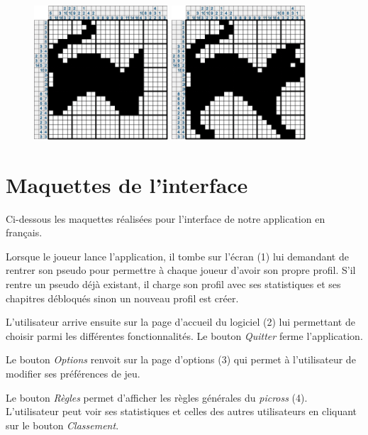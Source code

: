 \documentclass{report}
\begin{document}
\begin{figure}[H]
			\hspace{1cm}
          		\includegraphics[width=5cm]{../Images/cat/cat5.png}
			\hspace{1cm}
			\includegraphics[width=5cm]{../Images/cat/cat6.png}
		\end{figure}
		
	
	\section{Maquettes de l'interface}
      
      		Ci-dessous les maquettes réalisées pour l'interface de notre application en français. 
      		
      		Lorsque le joueur lance l'application, il tombe sur l'écran (1) lui demandant de rentrer son pseudo pour permettre à chaque joueur d'avoir son propre profil. S'il rentre un pseudo déjà existant, il charge son profil avec ses statistiques et ses chapitres débloqués sinon un nouveau profil est créer. 
      		
      		L'utilisateur arrive ensuite sur la page d'accueil du logiciel (2) lui permettant de choisir parmi les différentes fonctionnalités. Le bouton \textit{Quitter} ferme l'application. 
      		
      		Le bouton \textit{Options} renvoit sur la page d'options (3) qui permet à l'utilisateur de modifier ses préférences de jeu. 
      		
      		Le bouton \textit{Règles}  permet d'afficher les règles générales du \textit{picross} (4). L'utilisateur peut voir ses statistiques et celles des autres utilisateurs en cliquant sur le bouton \textit{Classement}. 
      		
\end{document}
